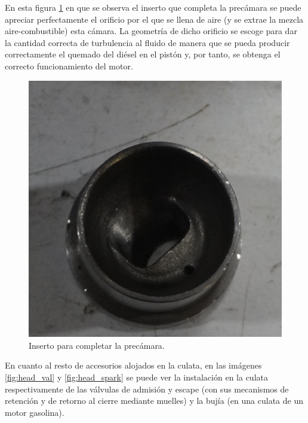 En esta figura \ref{fig:premezcla} en que se observa el inserto que completa la precámara se puede apreciar perfectamente el orificio por el que se llena de aire (y se extrae la mezcla aire-combustible) esta cámara. La geometría de dicho orificio se escoge para dar la cantidad correcta de turbulencia al fluido de manera que se pueda producir correctamente el quemado del diésel en el pistón y, por tanto, se obtenga el correcto funcionamiento del motor.

\begin{figure}[H]
	\centering
	\includegraphics[width=0.6\linewidth]{Figures/02/m3/premix.jpg}
	\caption{Inserto para completar la precámara.}
	\label{fig:premezcla}
\end{figure}

En cuanto al resto de accesorios alojados en la culata, en las imágenes \ref{fig:head_val} y \ref{fig:head_spark} se puede ver la instalación en la culata respectivamente de las válvulas de admisión y escape (con sus mecanismos de retención y de retorno al cierre mediante muelles) y la bujía (en una culata de un motor gasolina).

